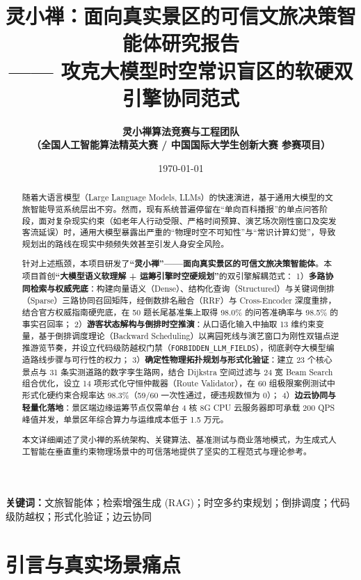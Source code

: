 \documentclass[11pt,a4paper]{ctexart}
\title{\LARGE\bfseries 灵小禅：面向真实景区的可信文旅决策智能体研究报告\\
\large —— 攻克大模型时空常识盲区的软硬双引擎协同范式}
\author{\bfseries 灵小禅算法竞赛与工程团队\\
\small（全国人工智能算法精英大赛 / 中国国际大学生创新大赛 参赛项目）}
\date{\today}
\begin{document}
\maketitle

\begin{abstract}
随着大语言模型（Large Language Models, LLMs）的快速演进，基于通用大模型的文旅智能导览系统层出不穷。然而，现有系统普遍停留在“单向百科播报”的单点问答阶段，面对复杂现实约束（如老年人行动受限、严格时间预算、演艺场次刚性窗口及突发客流延误）时，通用大模型暴露出严重的“物理时空不可知性”与“常识计算幻觉”，导致规划出的路线在现实中频频失效甚至引发人身安全风险。

针对上述瓶颈，本项目研发了\textbf{“灵小禅”——面向真实景区的可信文旅决策智能体}。本项目首创\textbf{“大模型语义软理解 + 运筹引擎时空硬规划”}的双引擎解耦范式：
1）\textbf{多路协同检索与权威兜底}：构建向量语义（Dense）、结构化查询（Structured）与关键词倒排（Sparse）三路协同召回矩阵，经倒数排名融合（RRF）与 Cross-Encoder 深度重排，结合官方权威指南硬兜底，在 50 题长尾基准集上取得 98.0\% 的问答准确率与 98.5\% 的事实召回率；
2）\textbf{游客状态解构与倒排时空推演}：从口语化输入中抽取 13 维约束变量，基于倒排调度理论（Backward Scheduling）以离园死线与演艺窗口为刚性双锚点逆推游览节奏，并设立代码级防越权门禁（\texttt{FORBIDDEN\_LLM\_FIELDS}），彻底剥夺大模型编造路线步骤与可行性的权力；
3）\textbf{确定性物理拓扑规划与形式化验证}：建立 23 个核心景点与 31 条实测道路的数字孪生路网，结合 Dijkstra 空间过滤与 24 宽 Beam Search 组合优化，设立 14 项形式化守恒仲裁器（Route Validator），在 60 组极限案例测试中形式化硬约束合规率达 98.3\%（59/60 一次性通过，硬违规数恒为 0）；
4）\textbf{边云协同与轻量化落地}：景区端边缘运筹节点仅需单台 4 核 8G CPU 云服务器即可承载 200 QPS 峰值并发，单景区年综合算力与运维成本低于 1.5 万元。

本文详细阐述了灵小禅的系统架构、关键算法、基准测试与商业落地模式，为生成式人工智能在垂直重约束物理场景中的可信落地提供了坚实的工程范式与理论参考。
\end{abstract}

\vspace{0.8em}
\noindent\textbf{关键词：}文旅智能体；检索增强生成 (RAG)；时空多约束规划；倒排调度；代码级防越权；形式化验证；边云协同

\newpage
\tableofcontents
\newpage


\section{引言与真实场景痛点}
\end{document}
